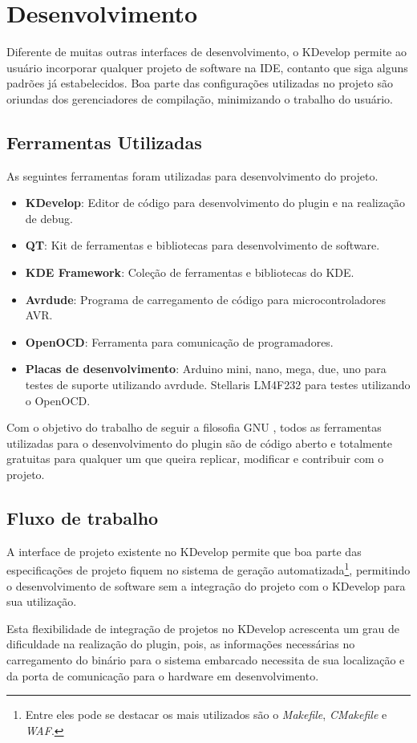 \chapter{Desenvolvimento}

Diferente de muitas outras interfaces de desenvolvimento, o KDevelop permite ao usuário incorporar qualquer projeto de software na IDE, contanto que siga alguns padrões já estabelecidos. Boa parte das configurações utilizadas no projeto são oriundas dos gerenciadores de compilação, minimizando o trabalho do usuário.

\section{Ferramentas Utilizadas}
As seguintes ferramentas foram utilizadas para desenvolvimento do projeto.
\begin{itemize}
 \item \textbf{KDevelop}: Editor de código para desenvolvimento do plugin e na realização de debug.
 \item \textbf{QT}: Kit de ferramentas e bibliotecas para desenvolvimento de software.
 \item \textbf{KDE Framework}: Coleção de ferramentas e bibliotecas do KDE.
 \item \textbf{Avrdude}: Programa de carregamento de código para microcontroladores AVR.
 \item \textbf{OpenOCD}: Ferramenta para comunicação de programadores.
 \item \textbf{Placas de desenvolvimento}: Arduino mini, nano, mega, due, uno para testes de suporte utilizando avrdude. Stellaris LM4F232 para testes utilizando o OpenOCD.
\end{itemize}

Com o objetivo do trabalho de seguir a filosofia GNU \cite{filosofia}, todos as ferramentas utilizadas para o desenvolvimento do plugin são de código aberto e totalmente gratuitas para qualquer um que queira replicar, modificar e contribuir com o projeto.

\section{Fluxo de trabalho}

A interface de projeto existente no KDevelop permite que boa parte das especificações de projeto fiquem no sistema de geração automatizada\footnote{Entre eles pode se destacar os mais utilizados são o \textit{Makefile}, \textit{CMakefile} e \textit{WAF}.}, permitindo o desenvolvimento de software sem a integração do projeto com o KDevelop para sua utilização.

Esta flexibilidade de integração de projetos no KDevelop acrescenta um grau de dificuldade na realização do plugin, pois, as informações necessárias no carregamento do binário para o sistema embarcado necessita de sua localização e da porta de comunicação para o hardware em desenvolvimento. %

